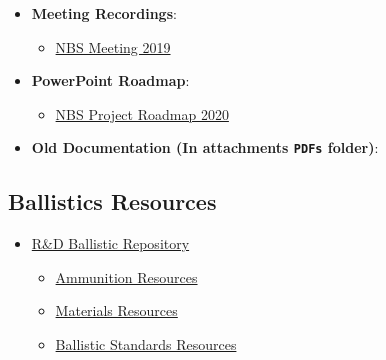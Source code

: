 \begin{itemize}
    \item \textbf{Meeting Recordings}:
    \begin{itemize}
        \item \href{https://nfmgroup.sharepoint.com/sites/TeamNBS/_layouts/15/stream.aspx?id=%2Fsites%2FTeamNBS%2FShared%20Documents%2FDevelopment%2FJournal%2F2019%2D03%2D06%20Ballistic%20DB%20Meeting%20Recording%2FAnalysis%20in%20Poland%20%2D%20Ballistics%20APP%20%2D%206%20marca%202019%2012%2E59%2E27%2Emp4&referrer=StreamWebApp%2EWeb&referrerScenario=AddressBarCopied%2Eview%2E8bb7dc3d%2Db572%2D45a0%2Db561%2Df8b5bdb5c8d0}{NBS Meeting 2019}
    \end{itemize}
    
    \item \textbf{PowerPoint Roadmap}:
    \begin{itemize}
        \item \href{https://nfmgroup.sharepoint.com/:p:/r/sites/TeamNBS/_layouts/15/Doc.aspx?sourcedoc=%7B94EF8FD6-C868-4573-8391-12CF90B109A7%7D&file=2020-04-17%20Ballistic%20DataBase%20Road%20Map%202020.pptx&action=edit&mobileredirect=true}{NBS Project Roadmap 2020}
    \end{itemize}
    
    \item \textbf{Old Documentation (In attachments \texttt{PDFs} folder)}:
\end{itemize}

\subsection{Ballistics Resources}

\begin{itemize}
    \item \href{https://nfmgroup.sharepoint.com/sites/RDB/Shared%20Documents/Forms/AllItems.aspx}{R\&D Ballistic Repository}
    \begin{itemize}
        \item \href{https://nfmgroup.sharepoint.com/sites/RDB/Shared%20Documents/Forms/AllItems.aspx?id=%2Fsites%2FRDB%2FShared%20Documents%2FBullets%20and%20range&viewid=8f1f582c%2D0312%2D4c50%2Dacf4%2De96ce474fe47}{Ammunition Resources}
        \item \href{https://nfmgroup.sharepoint.com/sites/RDB/Shared%20Documents/Forms/AllItems.aspx?id=%2Fsites%2FRDB%2FShared%20Documents%2FRaw%20Materials&viewid=8f1f582c%2D0312%2D4c50%2Dacf4%2De96ce474fe47}{Materials Resources}
        \item \href{https://nfmgroup.sharepoint.com/sites/RDB/Shared%20Documents/Forms/AllItems.aspx?id=%2Fsites%2FRDB%2FShared%20Documents%2FStandards&viewid=8f1f582c%2D0312%2D4c50%2Dacf4%2De96ce474fe47}{Ballistic Standards Resources}
    \end{itemize}
\end{itemize}

